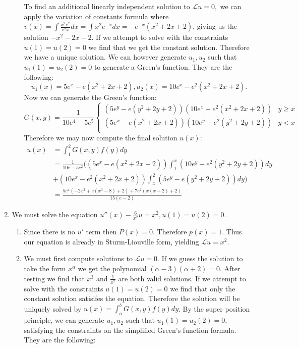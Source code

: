 \documentclass[12pt, letterpaper]{article}
\begin{document}
\begin{enumerate}
\begin{enumerate}
			To find an additional linearly independent solution to $\mathcal{L} u = 0,$ we can apply the variation of constants formula where $ v(x) = \int \frac{x^2 e^x}{e^2x} dx =  \int x^2 e^{-x} dx = -e^{-x}(x^2 + 2x + 2)$, giving us the solution $-x^2 -2x -2$.  If we attempt to solve with the constraints $u(1) = u(2) = 0$ we find that we get the constant solution.  Therefore we have a unique solution.  We can however generate $u_1, u_2$ such that $u_1(1) = u_2 (2) = 0$ to generate a Green's function.  They are the following:
			$$
			u_1(x) = 5e^x - e (x^2 + 2x + 2),  u_2(x) = 10e^x - e^2(x^2 + 2x + 2).
			$$
						Now we can generate the Green's function:
		$$
G(x,y) = \frac{1}{10e^4-5e^5} \begin{cases}
				(5e^y - e (y^2 + 2y + 2))(10e^x - e^2(x^2 + 2x + 2)) & y \geq x\\
				(5e^x - e (x^2 + 2x + 2))(10e^y - e^2(y^2 + 2y + 2)) & y < x\\
	\end {cases}		
		$$
		Therefore we may now compute the final solution $u(x)$:
			\begin{align*}
			u(x) &= \int_1^2 G(x,y) f(y) dy\\
			&= \frac{1}{10 e - 5e^2} \bigg(  (5e^x - e (x^2 + 2x + 2)) \int_1^x (10e^y - e^2(y^2 + 2y + 2)) dy \\
			&+ (10e^x - e^2(x^2 + 2x + 2)) \int_x^2 (5e^y - e (y^2 + 2y + 2)) dy \bigg)\\
			&=  \frac{5 e^x \left(-2 x^3+e \left(x^3-8\right)+2\right)+7 e^2 (x
   (x+2)+2)}{15 (e-2)}
			\end{align*}
		\end{enumerate}
		\item We must solve the equation $u''(x) -\frac{6}{x^2}u = x^2, u(1) = u(2) =0 $.
		\begin{enumerate}
			\item Since there is no $u'$ term then $P(x) = 0$.  Therefore $p(x) = 1$.  Thus our equation is already in Sturm-Liouville form, yielding $\mathcal{L} u = x^2$.  
			\item We must first compute solutions to $\mathcal{L} u = 0$.  If we guess the solution to take the form $x^\alpha$ we get the polynomial $(\alpha - 3)(\alpha + 2) = 0$.  After testing we find that $x^3$ and $\frac{1}{x^2}$ are both valid solutions.  If we attempt to solve with the constraints $u(1) = u(2) = 0$ we find that only the constant solution satisifes the equation.  Therefore the solution will be uniquely solved by $u(x) = \int_a^b G(x,y) f(y) dy$. By the super position principle, we can generate $u_1, u_2$ such that $u_1 (1) = u_2 (2) = 0$, satisfying the constraints on the simplified Green's function formula.  They are the following:

\end{enumerate}
\end{enumerate}
\end{document}
